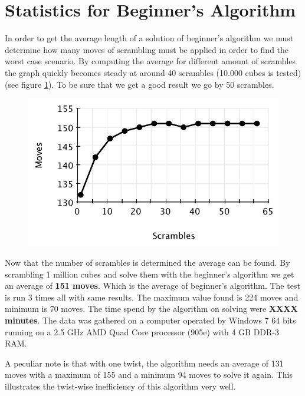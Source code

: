 \section{Statistics for Beginner's Algorithm}
\label{sec:beginnersStat}
In order to get the average length of a solution of beginner's algorithm we must determine how many moves of scrambling must be applied in order to find the worst case scenario. 
By computing the average for different amount of scrambles the graph quickly becomes steady at around 40 scrambles (10.000 cubes is tested) (see figure \ref{fig:beginnersScramble}). To be sure that we get a good result we go by 50 scrambles.
\begin{figure}[htbp]
	\centering
		\includegraphics{input/pics/beginnersScramble.pdf}
	\caption{}
	\label{fig:beginnersScramble}
\end{figure}

Now that the number of scrambles is determined the average can be found.
By scrambling 1 million cubes and solve them with the beginner's algorithm we get an average of \textbf{151 moves}. 
Which is the average of beginner's algorithm. The test is run 3 times all with same results.
The maximum value found is 224 moves and minimum is 70 moves. 
The time spend by the algorithm on solving were \textbf{XXXX minutes}. 
The data was gathered on a computer operated by Windows 7 64 bits running on a 2.5 GHz AMD Quad Core processor (905e) with 4 GB DDR-3 RAM.

A peculiar note is that with one twist, the algorithm needs an average of 131 moves with a maximum of 155 and a minimum 94 moves to solve it again.
This illustrates the twist-wise inefficiency of this algorithm very well.

